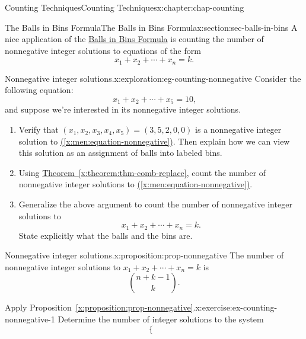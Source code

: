 \documentclass[oneside,10pt,]{book}
\newcommand{\xreffont}{\relax}
\numberwithin{equation}{section}
\begin{document}
\begin{chapterptx}{Counting Techniques}{}{Counting Techniques}{}{}{x:chapter:chap-counting}
\begin{sectionptx}{The Balls in Bins Formula}{}{The Balls in Bins Formula}{}{}{x:section:sec-balls-in-bins}
A nice application of the \hyperref[x:theorem:thm-comb-replace]{Balls in Bins Formula} is counting the number of nonnegative integer solutions to equations of the form%
\begin{equation*}
x_1 + x_2 + \cdots + x_n = k\text{.}
\end{equation*}
%
\begin{exploration}{Nonnegative integer solutions.}{x:exploration:eg-counting-nonnegative}%
Consider the following equation:%
\begin{equation}
x_1 + x_2 + \cdots + x_5 = 10\text{,}\label{x:men:equation-nonnegative}
\end{equation}
and suppose we're interested in its nonnegative integer solutions.%
\begin{enumerate}[font=\bfseries,label=(\alph*),ref=\alph*]
\item{}Verify that \((x_1,x_2,x_3,x_4,x_5) = (3,5,2,0,0)\) is a nonnegative integer solution to \hyperref[x:men:equation-nonnegative]{({\xreffont\ref{x:men:equation-nonnegative}})}. Then explain how we can view this solution as an assignment of balls into labeled bins.%
\item{}Using \hyperref[x:theorem:thm-comb-replace]{Theorem~{\xreffont\ref{x:theorem:thm-comb-replace}}}, count the number of nonnegative integer solutions to \hyperref[x:men:equation-nonnegative]{({\xreffont\ref{x:men:equation-nonnegative}})}.%
\item{}Generalize the above argument to count the number of nonnegative integer solutions to%
\begin{equation*}
x_1 + x_2 + \cdots + x_n = k\text{.}
\end{equation*}
State explicitly what the balls and the bins are.%
\end{enumerate}
\end{exploration}
\begin{proposition}{Nonnegative integer solutions.}{}{x:proposition:prop-nonnegative}%
The number of nonnegative integer solutions to \(x_1 + x_2 + \cdots + x_n = k\) is%
\begin{equation*}
\displaystyle\binom{n+k-1}{k}\text{.}
\end{equation*}
%
\end{proposition}
\begin{inlineexercise}{Apply Proposition~{\xreffont\ref*{x:proposition:prop-nonnegative}}.}{x:exercise:ex-counting-nonnegative-1}%
Determine the number of integer solutions to the system%
\begin{equation*}
\begin{cases}

\end{cases}
\end{equation*}
\end{inlineexercise}
\end{sectionptx}
\end{chapterptx}
\end{document}
